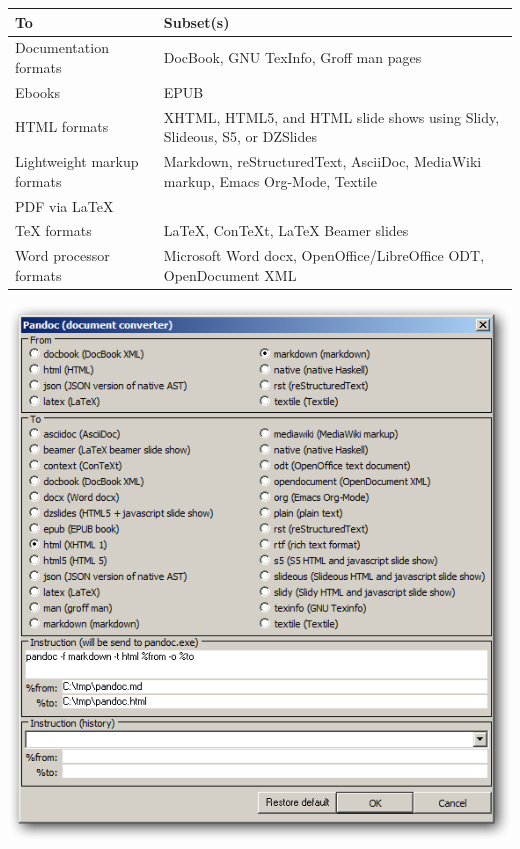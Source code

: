 \begin{footnotesize}\begin{tabularx}{\textwidth}{>{\hsize=0.4\hsize}X>{\hsize=0.7\hsize}X} \\
    \hline
    \textbf{To} & \textbf{Subset(s)} \\
    \hline
    Documentation formats & DocBook, GNU TexInfo, Groff man pages \\
    Ebooks & EPUB \\
    HTML formats & XHTML, HTML5, and HTML slide shows using Slidy, Slideous, S5, or DZSlides \\
    Lightweight markup formats & Markdown, reStructuredText, AsciiDoc, MediaWiki markup, Emacs Org-Mode, Textile \\
    PDF via LaTeX \\
    TeX formats & LaTeX, ConTeXt, LaTeX Beamer slides \\
    Word processor formats & Microsoft Word docx, OpenOffice/LibreOffice ODT, OpenDocument XML \\
    \hline
  \end{tabularx}\end{footnotesize}


\includegraphics[scale=0.50]{./res/pandoc.png}

